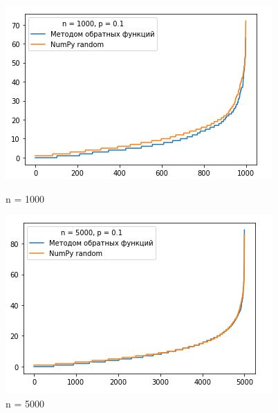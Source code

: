 \documentclass[a4paper,12pt, oneside]{book}
\begin{document}
{{\begin{figure}[h]
	\begin{center}
		\begin{minipage}[h]{0.4\linewidth}
			\includegraphics[width=1\linewidth]{py_2_1000.jpg}
			\caption{n = 1000} %
			\label{ris:experimoriginal} %
		\end{minipage}
		\hfill
		\begin{minipage}[h]{0.4\linewidth}
			\includegraphics[width=1\linewidth]{py_2_5000.jpg}
			\caption{n = 5000}
			\label{ris:experimcoded}
		\end{minipage}
	\end{center}
\end{figure} 


}}
\end{document}
